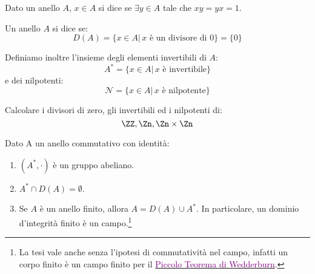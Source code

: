 \documentclass[11pt]{scrartcl}
\begin{document}
\begin{definition}
    Dato un anello $A$, $x \in A$ si dice  se $\exists y \in A$ tale che $xy=yx=1$.
\end{definition}

\begin{definition}
    Un anello $A$ si dice  se:
        \[ D(A) = \{x \in A |\, \text{$x$ è un divisore di $0$}\} = \{0\}
            \]
\end{definition}

Definiamo inoltre l'insieme degli elementi invertibili di $A$:
    \[ A^* = \{x \in A |\, \text{$x$ è invertibile}\}
        \]
e dei nilpotenti:
    \[ \mathcal{N} = \{x \in A |\, \text{$x$ è nilpotente}\} 
        \]

\begin{exercise}
    Calcolare i divisori di zero, gli invertibili ed i nilpotenti di:
        \[ \ZZ, \Zn, \Zn \times \Zn
            \]
\end{exercise}

\begin{soln}
    
\end{soln}

\begin{proposition}
    Dato A un anello commutativo con identità:
    \begin{enumerate}[(1)]
        \item $(A^*,\cdot)$ è un gruppo abeliano.
        \item $A^* \cap D(A) = \emptyset$.
        \item Se $A$ è un anello finito, allora $A = D(A) \cup A^*$. In particolare, un dominio
            d'integrità finito è un campo.\footnote{La tesi vale anche senza l'ipotesi di commutatività
            nel campo, infatti un corpo finito è un campo finito per il \href{https://en.wikipedia.org/wiki/Wedderburn\%27s_little_theorem}{\textcolor{purple}{Piccolo Teorema di Wedderburn}}.}
    \end{enumerate}
\end{proposition}
\end{document}
